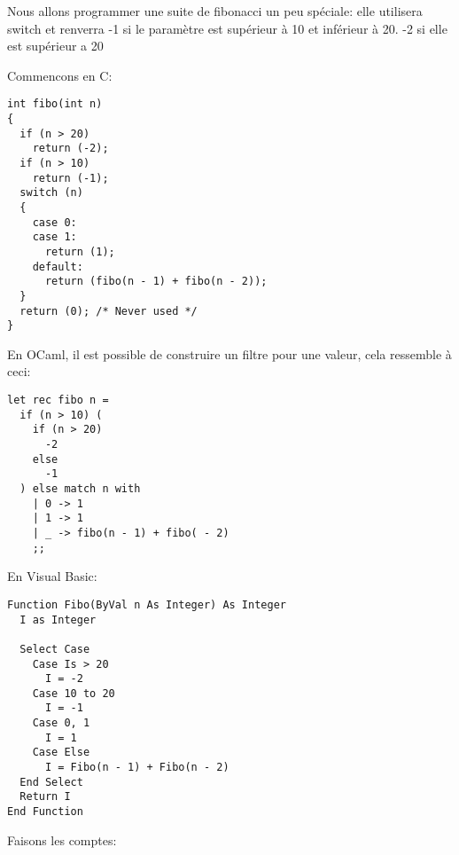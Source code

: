 \documentclass[a5paper, 12pt]{book}
\begin{document}
Nous allons programmer une suite de fibonacci un peu
spéciale: elle utilisera switch et renverra -1 si le
paramètre est supérieur à 10 et inférieur à 20. -2 si
elle est supérieur a 20

Commencons en C:\\

\begin{verbatim}
int fibo(int n)
{
  if (n > 20)
    return (-2);
  if (n > 10)
    return (-1);
  switch (n)
  {
    case 0:
    case 1:
      return (1);
    default:
      return (fibo(n - 1) + fibo(n - 2));
  }
  return (0); /* Never used */
}
\end{verbatim}

En OCaml, il est possible de construire un filtre pour une
valeur, cela ressemble à ceci:\\

\begin{verbatim}
let rec fibo n =
  if (n > 10) (
    if (n > 20)
      -2
    else
      -1
  ) else match n with
    | 0 -> 1
    | 1 -> 1
    | _ -> fibo(n - 1) + fibo( - 2)
    ;;
\end{verbatim}

En Visual Basic:\\

\begin{verbatim}
Function Fibo(ByVal n As Integer) As Integer
  I as Integer

  Select Case
    Case Is > 20
      I = -2
    Case 10 to 20
      I = -1
    Case 0, 1
      I = 1
    Case Else
      I = Fibo(n - 1) + Fibo(n - 2)
  End Select
  Return I
End Function
\end{verbatim}

Faisons les comptes:
\end{document}
